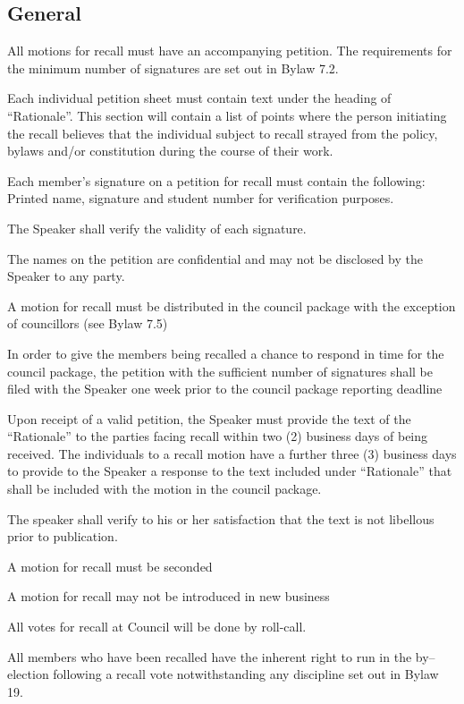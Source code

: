 \subsection{General}
\begin{longenum}[ label*=\thesubsection.\arabic*., align=left]
	\item  All motions for recall must have an accompanying petition. The requirements for the minimum number of signatures are set out in Bylaw 7.2.
	\begin{longenum}[ label*=\arabic*., align=left]
		\item Each individual petition sheet must contain text under the heading of ``Rationale''.  This section will contain a list of points where the person initiating the recall believes that the individual subject to recall strayed from the policy, bylaws and/or constitution during the course of their work.
        \item Each member's signature on a petition for recall must contain the following: Printed name, signature and student number for verification purposes.
        \item The Speaker shall verify the validity of each signature.
        \item The names on the petition are confidential and may not be disclosed by the Speaker to any party.
    \end{longenum}
    \item A motion for recall must be distributed in the council package with the exception of councillors (see Bylaw 7.5)
    \item In order to give the members being recalled a chance to respond in time for the council package, the petition with the sufficient number of signatures shall be filed with the Speaker one week prior to the council package reporting deadline
    \item Upon receipt of a valid petition, the Speaker must provide the text of the ``Rationale'' to the parties facing recall within two (2) business days of being received. The individuals to a recall motion have a further three (3) business days to provide to the Speaker a response to the text included under ``Rationale'' that shall be included with the motion in the council package.
    \item The speaker shall verify to his or her satisfaction that the text is not libellous prior to publication.
    \item A motion for recall must be seconded
    \item A motion for recall may not be introduced in new business
    \item All votes for recall at Council will be done by roll-call.
    \item All members who have been recalled have the inherent right to run in the by--election following a recall vote notwithstanding any discipline set out in Bylaw 19.
\end{longenum}

